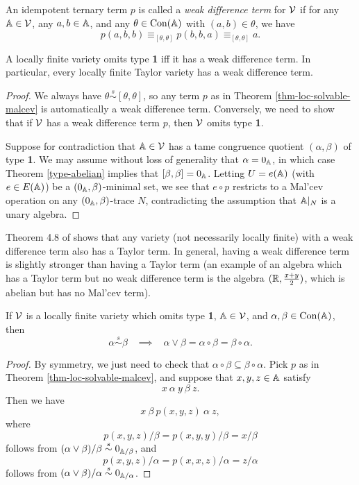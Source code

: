\begin{appendices}
\begin{defn} An idempotent ternary term $p$ is called a \emph{weak difference term} for $\mathcal{V}$ if for any $\mathbb{A} \in \mathcal{V}$, any $a,b \in \mathbb{A}$, and any $\theta \in \operatorname{Con}(\mathbb{A})$ with $(a,b) \in \theta$, we have
\[
p(a,b,b) \equiv_{[\theta,\theta]} p(b,b,a) \equiv_{[\theta,\theta]} a.
\]
\end{defn}

\begin{cor} A locally finite variety omits type \textbf{1} iff it has a weak difference term. In particular, every locally finite Taylor variety has a weak difference term.
\end{cor}
\begin{proof} We always have $\theta \stackrel{s}{\sim} [\theta,\theta]$, so any term $p$ as in Theorem \ref{thm-loc-solvable-malcev} is automatically a weak difference term. Conversely, we need to show that if $\mathcal{V}$ has a weak difference term $p$, then $\mathcal{V}$ omits type \textbf{1}.

Suppose for contradiction that $\mathbb{A} \in \mathcal{V}$ has a tame congruence quotient $(\alpha,\beta)$ of type \textbf{1}. We may assume without loss of generality that $\alpha = 0_{\mathbb{A}}$, in which case Theorem \ref{type-abelian} implies that $[\beta,\beta] = 0_{\mathbb{A}}$. Letting $U = e(\mathbb{A})$ (with $e \in E(\mathbb{A})$) be a $(0_{\mathbb{A}}, \beta)$-minimal set, we see that $e \circ p$ restricts to a Mal'cev operation on any $(0_{\mathbb{A}},\beta)$-trace $N$, contradicting the assumption that $\mathbb{A}|_N$ is a unary algebra.
\end{proof}

\begin{rem} Theorem 4.8 of \cite{kearnes-taylor-affine} shows that any variety (not necessarily locally finite) with a weak difference term also has a Taylor term. In general, having a weak difference term is slightly stronger than having a Taylor term (an example of an algebra which has a Taylor term but no weak difference term is the algebra $(\mathbb{R}, \frac{x+y}{2})$, which is abelian but has no Mal'cev term).
\end{rem}

\begin{cor} If $\mathcal{V}$ is a locally finite variety which omits type \textbf{1}, $\mathbb{A} \in \mathcal{V}$, and $\alpha, \beta \in \operatorname{Con}(\mathbb{A})$, then
\[
\alpha \stackrel{s}{\sim} \beta \;\;\; \implies \;\;\; \alpha \vee \beta = \alpha \circ \beta = \beta \circ \alpha.
\]
\end{cor}
\begin{proof} By symmetry, we just need to check that $\alpha \circ \beta \subseteq \beta \circ \alpha$. Pick $p$ as in Theorem \ref{thm-loc-solvable-malcev}, and suppose that $x,y,z \in \mathbb{A}$ satisfy
\[
x\ \alpha\ y\ \beta\ z.
\]
Then we have
\[
x\ \beta\ p(x,y,z)\ \alpha\ z,
\]
where
\[
p(x,y,z)/\beta = p(x,y,y)/\beta = x/\beta
\]
follows from $(\alpha \vee \beta)/\beta \stackrel{s}{\sim} 0_{\mathbb{A}/\beta}$, and
\[
p(x,y,z)/\alpha = p(x,x,z)/\alpha = z/\alpha
\]
follows from $(\alpha \vee \beta)/\alpha \stackrel{s}{\sim} 0_{\mathbb{A}/\alpha}$.
\end{proof}


\end{appendices}
